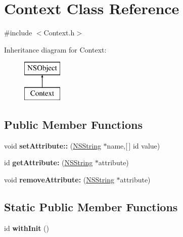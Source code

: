 \hypertarget{interface_context}{
\section{\-Context \-Class \-Reference}
\label{interface_context}
}


{\ttfamily \#include $<$\-Context.\-h$>$}

\-Inheritance diagram for \-Context\-:\begin{figure}[H]
\begin{center}
\leavevmode
\includegraphics[height=2.000000cm]{interface_context}
\end{center}
\end{figure}
\subsection*{\-Public \-Member \-Functions}
\begin{DoxyCompactItemize}
\item 
\hypertarget{interface_context_a4b1c1a4b57ff349ec70247084261fad0}{
void {\bfseries set\-Attribute\-::} (\hyperlink{class_n_s_string}{\-N\-S\-String} $\ast$name,\mbox{[}$\,$\mbox{]} id value)}
\label{interface_context_a4b1c1a4b57ff349ec70247084261fad0}

\item 
\hypertarget{interface_context_a59e340be3fd52fd67e388a2b5f4587cb}{
id {\bfseries get\-Attribute\-:} (\hyperlink{class_n_s_string}{\-N\-S\-String} $\ast$attribute)}
\label{interface_context_a59e340be3fd52fd67e388a2b5f4587cb}

\item 
\hypertarget{interface_context_a563b46be6755272bf93782b989712f41}{
void {\bfseries remove\-Attribute\-:} (\hyperlink{class_n_s_string}{\-N\-S\-String} $\ast$attribute)}
\label{interface_context_a563b46be6755272bf93782b989712f41}

\end{DoxyCompactItemize}
\subsection*{\-Static \-Public \-Member \-Functions}
\begin{DoxyCompactItemize}
\item 
\hypertarget{interface_context_a05071f2135b2f53b61ace92f1d316a7c}{
id {\bfseries with\-Init} ()}
\label{interface_context_a05071f2135b2f53b61ace92f1d316a7c}

\end{DoxyCompactItemize}
